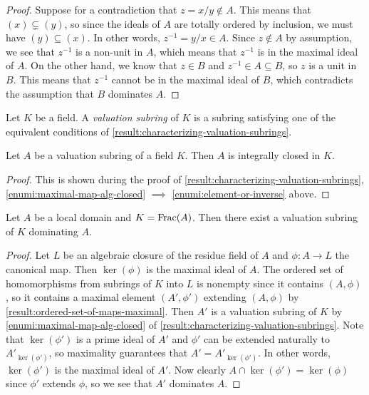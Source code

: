 \begin{proof}
Suppose for a contradiction that $z = x/y \notin A$. This means that $(x) \subsetneq (y)$, so since the ideals of $A$ are totally ordered by inclusion, we must have $(y) \subseteq (x)$. In other words, $z^{-1} = y/x \in A$. Since $z \notin A$ by assumption, we see that $z^{-1}$ is a non-unit in $A$, which means that $z^{-1}$ is in the maximal ideal of $A$. On the other hand, we know that $z \in B$ and $z^{-1} \in A \subseteq B$, so $z$ is a unit in $B$. This means that $z^{-1}$ cannot be in the maximal ideal of $B$, which contradicts the assumption that $B$ dominates $A$. 
\end{proof}

\begin{definition}
\label{definition:valuation-subring}
Let $K$ be a field. A \emph{valuation subring} of $K$ is a subring satisfying one of the equivalent conditions of \cref{result:characterizing-valuation-subrings}. 
\end{definition}

\begin{lemma}
\label{result:valuation-subrings-integrally-closed}
Let $A$ be a valuation subring of a field $K$. Then $A$ is integrally closed in $K$. 
\end{lemma}

\begin{proof}
This is shown during the proof of \cref{result:characterizing-valuation-subrings}, \ref{enumi:maximal-map-alg-closed} $\implies$ \ref{enumi:element-or-inverse} above. 
\end{proof}

\begin{lemma}
\label{result:local-rings-dominated-by-valuation-rings}
Let $A$ be a local domain and $K = \operatorname{Frac}(A)$. Then there exist a valuation subring of $K$ dominating $A$. 
\end{lemma}

\begin{proof}
Let $L$ be an algebraic closure of the residue field of $A$ and $\phi : A \to L$ the canonical map. Then $\ker(\phi)$ is the maximal ideal of $A$. The ordered set of homomorphisms from subrings of $K$ into $L$ is nonempty since it contains $(A, \phi)$, so it contains a maximal element $(A', \phi')$ extending $(A, \phi)$ by \cref{result:ordered-set-of-maps-maximal}. Then $A'$ is a valuation subring of $K$ by \cref{enumi:maximal-map-alg-closed} of \cref{result:characterizing-valuation-subrings}. Note that $\ker(\phi')$ is a prime ideal of $A'$ and $\phi'$ can be extended naturally to $A'_{\ker(\phi')}$, so maximality guarantees that $A' = A'_{\ker(\phi')}$. In other words, $\ker(\phi')$ is the maximal ideal of $A'$. Now clearly $A \cap \ker(\phi') = \ker(\phi)$ since $\phi'$ extends $\phi$, so we see that $A'$ dominates $A$. 
\end{proof}

